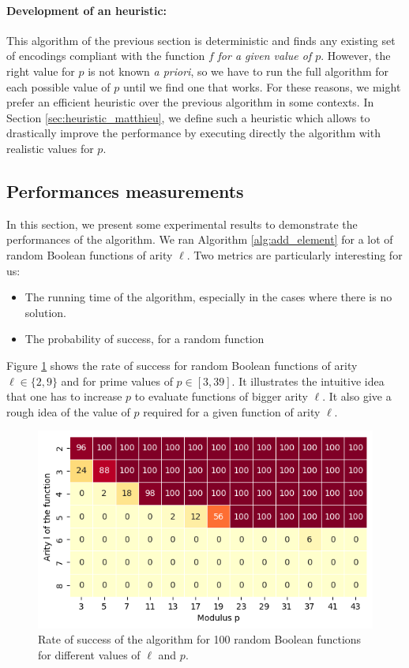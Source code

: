 \paragraph{Development of an heuristic:} This algorithm of the previous section is deterministic and finds any existing set of encodings compliant with the function $f$ \emph{for a given value of $p$}. However, the right value for $p$ is not known \emph{a priori}, so we have to run the full algorithm for each possible value of $p$ until we find one that works. For these reasons, we might prefer an efficient heuristic over the previous algorithm in some contexts. In Section \ref{sec:heuristic_matthieu}, we define such a heuristic which allows to drastically improve the performance by executing directly the algorithm with realistic values for $p$. 




\subsection{Performances measurements}

In this section, we present some experimental results to demonstrate the performances of the algorithm. We ran Algorithm \ref{alg:add_element} for a lot of random Boolean functions of arity $\ell$. Two metrics are particularly interesting for us:
\begin{itemize}
    \item The running time of the algorithm, especially in the cases where there is no solution.
    \item The probability of success, for a random function
\end{itemize}


Figure \ref{fig:heatmap_success} shows the rate of success for random Boolean functions of arity $\ell \in \{2, 9\}$ and for prime values of $p \in [3, 39]$. It illustrates the intuitive idea that one has to increase $p$ to evaluate functions of bigger arity $\ell$. It also give a rough idea of the value of $p$ required for a given function of arity $\ell$.

\begin{figure}
    \centering
    \includegraphics[]{img/p_encodings/heatmap_success.png}
    \caption{Rate of success of the algorithm for 100 random Boolean functions for different values of $\ell$ and $p$.}
    \label{fig:heatmap_success}
\end{figure}


